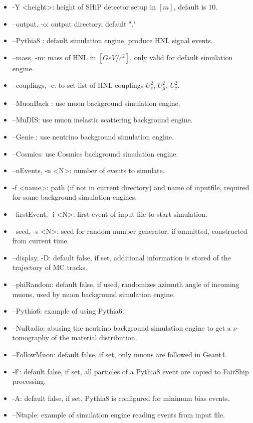 \documentclass[12pt,a4paper]{article}
\begin{document}
\begin{itemize}
\item -Y \textless height\textgreater : height of SHiP detector setup in $[m]$, default is $10$. 
\item --output, -o: output directory, default "."
\item --Pythia8 : default simulation engine, produce HNL signal events.
\item --mass, -m: mass of HNL in $[GeV/c^2]$, only valid for default simulation engine.
\item --couplings, -c: to set list of HNL couplings $U^2_e$, $U^2_\mu$, $U^2_\tau$.
\item --MuonBack : use muon background simulation engine.
\item --MuDIS: use muon inelastic scattering background engine.
\item --Genie : use neutrino background simulation engine.
\item --Cosmics: use Cosmics background simulation engine.
\item --nEvents, -n \textless N\textgreater: number of events to simulate.
\item -f \textless name\textgreater : path (if not in current directory) and name of inputfile, required for some background simulation engines.
\item --firstEvent, -i \textless N\textgreater: first event of input file to start simulation.
\item  --seed, -s \textless N\textgreater: seed for random number generator, if ommitted, constructed from current time.
\item --display, -D: default false, if set, additional information is stored of the trajectory of MC tracks.
\item --phiRandom: default false, if used, randomizes azimuth angle of incoming muons, used by muon background simulation engine.
\item --Pythia6: example of using Pythia6.
\item --NuRadio: abusing the neutrino background simulation engine to get a $\nu$-tomography of the material distribution.
\item --FollowMuon: default false, if set, only muons are followed in Geant4.
\item -F: default false, if set, all particles of a Pythia8 event are copied to FairShip processing.
\item -A: default false, if set, Pythia8 is configured for minimum bias events.
\item --Ntuple: example of simulation engine reading events from input file.
\end{itemize}
\end{document}
